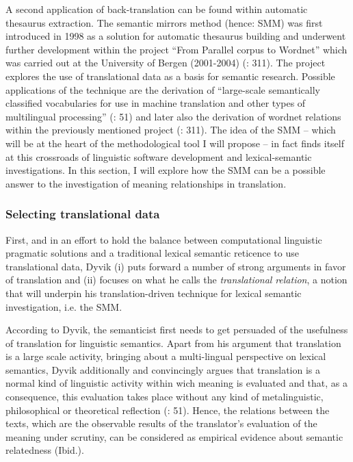 A second application of back-translation can be found within automatic thesaurus extraction. The semantic mirrors method (hence: SMM) was first introduced in 1998 as a solution for automatic thesaurus building and underwent further development within the project “From Parallel corpus to Wordnet” which was carried out at the University of Bergen (2001-2004) (\citealt{aijmer_translations_2004}: 311). The project explores the use of translational data as a basis for semantic research. Possible applications of the technique are the derivation of “large-scale semantically classified vocabularies for use in machine translation and other types of multilingual processing” (\citealt{johansson_translational_1998}: 51) and later also the derivation of wordnet relations within the previously mentioned project (\citealt{aijmer_translations_2004}: 311). The idea of the SMM – which will be at the heart of the methodological tool I will propose – in fact finds itself at this crossroads of linguistic software development and lexical-semantic investigations. In this section, I will explore how the SMM can be a possible answer to the investigation of meaning relationships in translation.


\subsubsection{\label{sec:2.3.4.1}  Selecting translational data}

First, and in an effort to hold the balance between computational linguistic pragmatic solutions and a traditional lexical semantic reticence to use translational data, Dyvik (i) puts forward a number of strong arguments in favor of translation and (ii) focuses on what he calls the \textit{translational} \textit{relation}, a notion that will underpin his translation-driven technique for lexical semantic investigation, i.e. the SMM.



According to Dyvik, the semanticist first needs to get persuaded of the usefulness of translation for linguistic semantics. Apart from his argument that translation is a large scale activity, bringing about a multi-lingual perspective on lexical semantics, Dyvik additionally and convincingly argues that translation is a normal kind of linguistic activity within wich meaning is evaluated and that, as a consequence, this evaluation takes place without any kind of metalinguistic, philosophical or theoretical reflection (\citealt{johansson_translational_1998}: 51). Hence, the relations between the texts, which are the observable results of the translator’s evaluation of the meaning under scrutiny, can be considered as empirical evidence about semantic relatedness (Ibid.).




